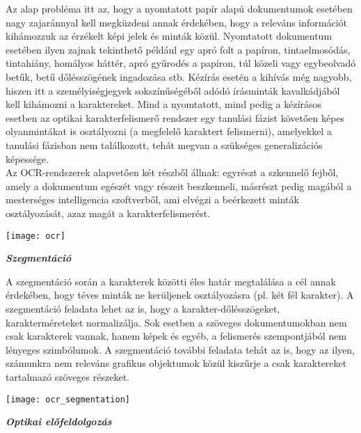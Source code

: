 Az alap probléma itt az, hogy a nyomtatott papír alapú dokumentumok esetében nagy zajaránnyal kell megküzdeni annak érdekében, hogy a releváns információt kihámozzuk az érzékelt képi jelek és minták közül. Nyomtatott dokumentum esetében ilyen zajnak tekinthető például egy apró folt a papíron, tintaelmosódás, tintahiány, homályos háttér, apró gyűrodés a papíron, túl közeli vagy egybeolvadó betűk, betű dőlésszögének ingadozása stb. Kézírás esetén a kihívás még nagyobb, hiszen itt a személyiségjegyek sokszínűségéből adódó írásminták kavalkádjából kell kihámozni a karaktereket. Mind a nyomtatott, mind pedig a kézírásos esetben az optikai karakterfelismerő rendszer egy tanulási fázist követően képes olyanmintákat is osztályozni (a megfelelő karaktert felismerni), amelyekkel a tanulási fázisban nem találkozott, tehát megvan a szükséges generalizációs képessége.\\

Az OCR-rendszerek alapvetően két részből állnak: egyrészt a szkennelő fejből, amely a dokumentum egészét vagy részeit beszkenneli, másrészt pedig magából a mesterséges intelligencia szoftverből, ami elvégzi a beérkezett minták osztályozását, azaz magát a karakterfelismerést.\\

\begin{center}
\texttt{[image: ocr]}
\end{center}

\begin{flushleft}
\textit{\textbf{{\large Szegmentáció\\}}}
\end{flushleft}

A szegmentáció során a karakterek közötti éles határ megtalálása a cél annak érdekében, hogy téves minták ne kerüljenek osztályozásra (pl. két fél karakter). A szegmentáció feladata lehet az is, hogy a karakter-dőlésszögeket, karakterméreteket normalizálja. Sok esetben a szöveges dokumentumokban nem csak karakterek vannak, hanem képek és egyéb, a felismerés szempontjából nem lényeges szimbólumok. A szegmentáció további feladata tehát az is, hogy az ilyen, számunkra nem releváns grafikus objektumok közül kiszűrje a csak karaktereket tartalmazó szöveges részeket.\\

\begin{center}
\texttt{[image: ocr\_segmentation]}
\end{center}

\begin{flushleft}
\textit{\textbf{{\large Optikai előfeldolgozás\\}}}
\end{flushleft}

